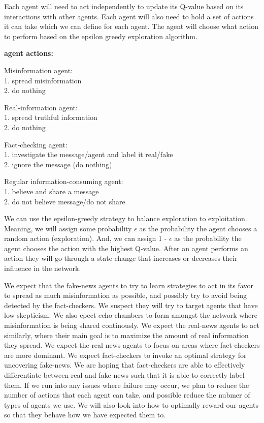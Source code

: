 \documentclass[12pt,twoside]{article}
\begin{document}
Each agent will need to act independently to update its Q-value based on its interactions with other agents. Each agent will also need to hold a set of actions it can take which we can define for each agent. The agent will choose what action to perform based on the epsilon greedy exploration algorithm. 

\textbf{agent actions:}

Misinformation agent:\\
1. spread misinformation\\
2. do nothing

Real-information agent:\\
1. spread truthful information\\
2. do nothing

Fact-checking agent:\\
1. investigate the message/agent and label it real/fake\\
2. ignore the message (do nothing)

Regular information-consuming agent:\\
1. believe and share a message\\
2. do not believe message/do not share

We can use the epsilon-greedy strategy to balance exploration to exploitation. Meaning, we will assign some probability 
$\epsilon$
 as the probability the agent chooses a random action (exploration). And, we can assign 1 - $\epsilon$
 as the probability the agent chooses the action with the highest Q-value. After an agent performs an action they will go through a state change that increases or decreases their influence in the network.

We expect that the fake-news agents to try to learn strategies to act in its favor to spread as much misinformation as possible, and possibly try to avoid being detected by the fact-checkers. We suspect they will try to target agents that have low skepticism. We also epect echo-chambers to form amongst the network where misinformation is being shared continously. We expect the real-news agents to act similarly, where their main goal is to maximize the amount of real information they spread. We expect the real-news agents to focus on areas where fact-checkers are more dominant. We expect fact-checkers to invoke an optimal strategy for uncovering fake-news. We are hoping that fact-checkers are able to effectively differentiate between real and fake news such that it is able to correctly label them. If we run into any issues where failure may occur, we plan to reduce the number of actions that each agent can take, and possible reduce the nubmer of types of agents we use. We will also look into how to optimally reward our agents so that they behave how we have expected them to.
\end{document}

